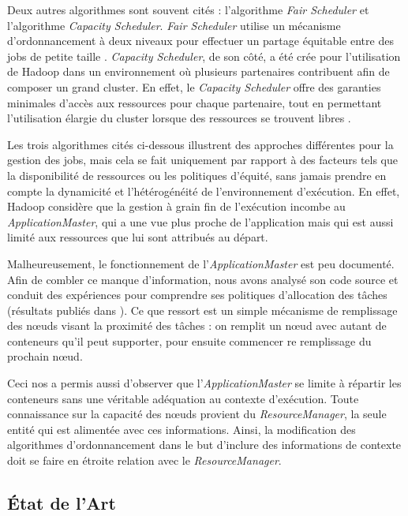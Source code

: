 Deux autres algorithmes sont souvent cités : l'algorithme \textit{Fair Scheduler} et l'algorithme \textit{Capacity Scheduler}. \textit{Fair Scheduler} utilise un mécanisme d'ordonnancement à deux niveaux pour effectuer un partage équitable entre des jobs de petite taille \cite{Hadoop}. \textit{Capacity Scheduler}, de son côté, a été crée pour l'utilisation de Hadoop dans un environnement où plusieurs partenaires contribuent afin de composer un grand cluster. En effet, le \textit{Capacity Scheduler} offre des garanties minimales d'accès aux ressources pour chaque partenaire, tout en permettant l'utilisation élargie du cluster lorsque des ressources se trouvent libres \cite{Hadoop}.

Les trois algorithmes cités ci-dessous illustrent des approches différentes pour la gestion des jobs, mais cela se fait uniquement par rapport à des facteurs tels que la disponibilité de ressources ou les politiques d'équité, sans jamais prendre en compte la dynamicité et l'hétérogénéité de l'environnement d'exécution. En effet, Hadoop considère que la gestion à grain fin de l'exécution incombe au  \textit{ApplicationMaster}, qui a une vue plus proche de l'application mais qui est aussi limité aux ressources que lui sont attribués au départ.

Malheureusement, le fonctionnement de l'\textit{ApplicationMaster} est peu documenté. Afin de combler ce manque d'information, nous avons analysé son code source et conduit des expériences pour comprendre ses politiques d'allocation des tâches (résultats publiés dans \cite{UBICOMM2014}). Ce que ressort est un simple mécanisme de remplissage des n{\oe}uds visant la proximité des tâches : on remplit un n{\oe}ud avec autant de conteneurs qu'il peut supporter, pour ensuite commencer re remplissage du prochain n{\oe}ud.   

Ceci nos a permis aussi d'observer que l'\textit{ApplicationMaster} se limite à répartir les conteneurs sans une véritable adéquation au contexte d'exécution. Toute connaissance sur la capacité des n{\oe}uds provient du \textit{ResourceManager}, la seule entité qui est alimentée avec ces informations. Ainsi, la modification des algorithmes d'ordonnancement dans le but d'inclure des informations de contexte doit se faire en étroite relation avec le \textit{ResourceManager}.



\subsection{État de l'Art} \label{sec:related}

